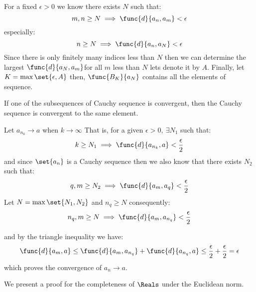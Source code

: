 \begin{prooflemma}
    For a fixed \(\epsilon > 0\) we know there exists \(N\) such that:
    \begin{equation*}
        m,n \geq N \implies \func{d}{a_n,a_m} < \epsilon
    \end{equation*}
    especially:
    \begin{equation*}
        n \geq N \implies \func{d}{a_n,a_N} < \epsilon
    \end{equation*}
    Since there is only finitely many indices less than \(N\) then we can determine the largest \(\func{d}{a_N, a_m}\)for all \(m\) less than \(N\) lets denote it by \(A\). Finally, let \(K = \max \set{ \epsilon, A}\) then, \(\func{B_K}{a_N} \) contains all the elements of sequence.
\end{prooflemma}

\begin{lemma} \label{convergenceSubsequence}
    If one of the subsequences of Cauchy sequence is convergent, then the Cauchy sequence is convergent to the same element.
\end{lemma}

\begin{prooflemma}
    Let \(a_{n_k} \to a \) when \(k \to \infty\) That is, for a given \(\epsilon > 0,\: \exists N_1\) such that:
    \begin{equation*}
        k \geq N_1 \implies \func{d}{a_{n_k},a} < \frac{\epsilon}{2}
    \end{equation*}
    and since \(\set{a_n} \) is a Cauchy sequence then we also know that there exists \(N_2\) such that:
    \begin{equation*}
        q,m \geq N_2 \implies \func{d}{a_m,a_q} < \frac{\epsilon}{2}
    \end{equation*}
    Let \(N = \max \set{ N_1, N_2} \) and \(n_q \geq N\) consequently:
    \begin{equation*}
        n_q,m \geq N \implies \func{d}{a_m,a_{n_q}} < \frac{\epsilon}{2}
    \end{equation*}

    and by the triangle inequality we have:
    \begin{equation*}
        \func{d}{a_m,a} \leq \func{d}{a_m, a_{n_q}} + \func{d}{a_{n_q},a} \leq \frac{\epsilon}{2} + \frac{\epsilon}{2} = \epsilon
    \end{equation*}
    which proves the convergence of \(a_n \to a\).
\end{prooflemma}

We present a proof for the completeness of \(\Reals\) under the Euclidean norm.

